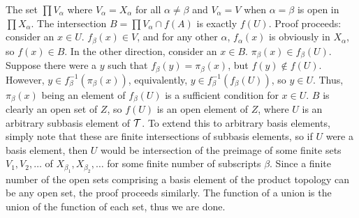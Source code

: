 \documentclass[12pt,letterpaper]{article}
\begin{document}
\begin{enumerate}
\begin{enumerate}
    The set $\prod V_\alpha$ where $V_\alpha = X_\alpha$ for all $\alpha \neq \beta$ and $V_\alpha=V$ when $\alpha=\beta$ is open in $\prod X_\alpha$. The intersection $B = \prod V_\alpha\cap f(A)$ is exactly $f(U)$. Proof proceeds: consider an $x\in U$. $f_\beta(x) \in V$, and for any other $\alpha$, $f_\alpha(x)$ is obviously in $X_\alpha$, so $f(x)\in B$. In the other direction, consider an $x\in B$. $\pi_\beta(x) \in f_\beta(U)$. Suppose there were a $y$ such that $f_\beta(y)=\pi_\beta(x)$, but $f(y)\not\in f(U)$. However, $y\in f^{-1}_\beta(\pi_\beta(x))$, equivalently, $y\in f^{-1}_\beta(f_\beta(U))$, so $y\in U$. Thus, $\pi_\beta(x)$ being an element of $f_\beta(U)$ is a sufficient condition for $x\in U$. %
    $B$ is clearly an open set of $Z$, so $f(U)$ is an open element of $Z$, where $U$ is an arbitrary subbasis element of $\mathcal{T}$. To extend this to arbitrary basis elements, simply note that these are finite intersections of subbasis elements, so if $U$ were a basis element, then $U$ would be intersection of the preimage of some finite sets $V_1, V_2,\dots$ of $X_{\beta_1},X_{\beta_2},\dots$ for some finite number of subscripts $\beta$. Since a finite number of the open sets comprising a basis element of the product topology can be any open set, the proof proceeds similarly. The function of a union is the union of the function of each set, thus we are done.
  \end{enumerate}
\end{enumerate}
\end{document}
